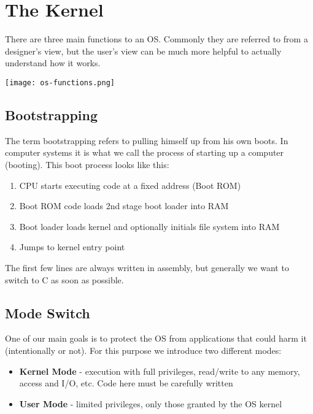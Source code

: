 \section{The Kernel}

There are three main functions to an OS. Commonly they are referred to from a designer's view, but the user's view can be much more helpful to actually understand how it works.

\begin{center}
	\texttt{[image: os-functions.png]}
\end{center}


\subsection{Bootstrapping}

The term bootstrapping refers to pulling himself up from his own boots. In computer systems it is what we call the process of starting up a computer (booting). This boot process looks like this:

\begin{enumerate}
	\item CPU starts executing code at a fixed address (Boot ROM)
	\item Boot ROM code loads 2nd stage boot loader into RAM
	\item Boot loader loads kernel and optionally initials file system into RAM
	\item Jumps to kernel entry point
\end{enumerate}

The first few lines are always written in assembly, but generally we want to switch to C as soon as possible.


\subsection{Mode Switch}

One of our main goals is to protect the OS from applications that could harm it (intentionally or not). For this purpose we introduce two different modes:

\begin{itemize}
	\item \textbf{Kernel Mode} - execution with full privileges, read/write to any memory, access and I/O, etc. Code here must be carefully written
	\item \textbf{User Mode} - limited privileges, only those granted by the OS kernel
\end{itemize}

